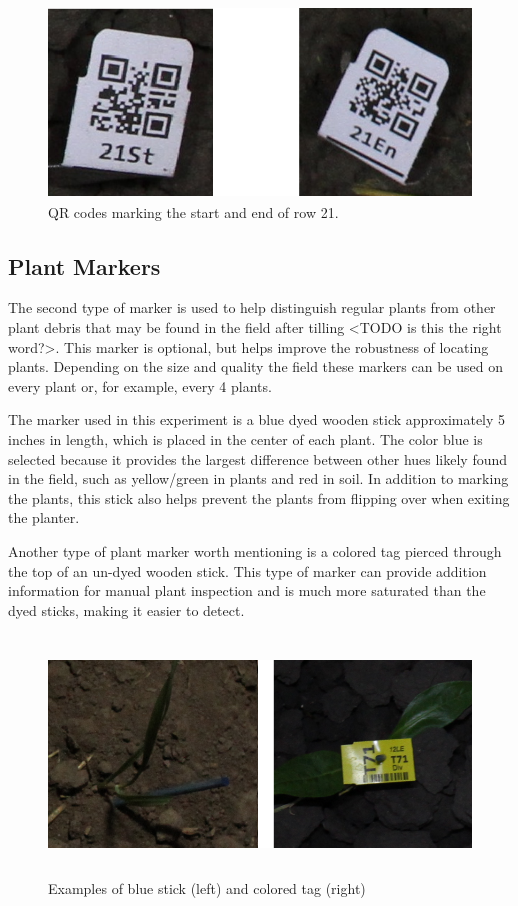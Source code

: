 \begin{figure}[htb]
	\centering
    \includegraphics[height=2in]{figures/row_codes.png}
    \caption[Row QR codes]{QR codes marking the start and end of row 21.}
    \label{figure:row_codes}
\end{figure}

\subsection{Plant Markers}

The second type of marker is used to help distinguish regular plants from other plant debris that may be found in the field after tilling <TODO is this the right word?>.  This marker is optional, but helps improve the robustness of locating plants.  Depending on the size and quality the field these markers can be used on every plant or, for example, every 4 plants. 

The marker used in this experiment is a blue dyed wooden stick approximately 5 inches in length, which is placed in the center of each plant. The color blue is selected because it provides the largest difference between other hues likely found in the field, such as yellow/green in plants and red in soil.  In addition to marking the plants, this stick also helps prevent the plants from flipping over when exiting the planter.

Another type of plant marker worth mentioning is a colored tag pierced through the top of an un-dyed wooden stick.  This type of marker can provide addition information for manual plant inspection and is much more saturated than the dyed sticks, making it easier to detect. 

\begin{figure}[htb]
	\centering
    \includegraphics[height=2.5in]{figures/plant_markers.png}
    \caption[Plant markers]{Examples of blue stick (left) and colored tag (right)}
    \label{figure:plant_markers}
\end{figure}
